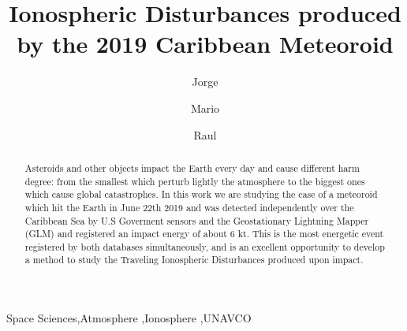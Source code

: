 \documentclass[times,twocolumn,final,authoryear]{elsarticle}
\begin{document}

\begin{frontmatter}

\title{Ionospheric Disturbances produced by the 2019 Caribbean Meteoroid}%

\author[1]{Jorge }

\author[1]{Mario }
\author[1]{Raul }

\address[1]{Escuela Nacional de Estudios Superiores, UNAM, campus Morelia, Antigua Carretera a P\'atzcuaro No. 8701
Col. Ex Hacienda de San Jos\'e de la Huerta, Morelia, Michoac\'an, 58190, M\'exico}

\received{}
\finalform{}
\accepted{}
\availableonline{}


\begin{abstract}
Asteroids and other objects impact the Earth every day and cause different harm degree: from the smallest which perturb lightly the atmosphere to the biggest ones which cause global catastrophes. In this work we are studying the case of a meteoroid which hit the Earth in June 22th 2019 and was detected independently over the Caribbean Sea by U.S Goverment sensors and the Geostationary Lightning Mapper (GLM) and registered an impact energy of about 6 kt. This is the most energetic event registered by both databases simultaneously, and is an excellent opportunity to develop a method to study the Traveling Ionospheric Disturbances produced upon impact.
\end{abstract}

\begin{keyword}
\KWD Space Sciences\sep Atmosphere \sep Ionosphere \sep UNAVCO%
\end{keyword}
\end{frontmatter}

\end{document}
